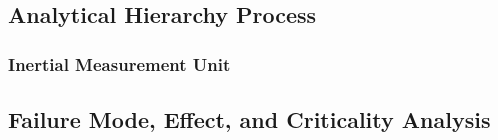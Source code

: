 \subsection{Analytical Hierarchy Process} \label{ssec:ahp}

\subsubsection*{Inertial Measurement Unit} \label{sssec:ahp_imu}

\subsection{Failure Mode, Effect, and Criticality Analysis} \label{ssec:fmeca}